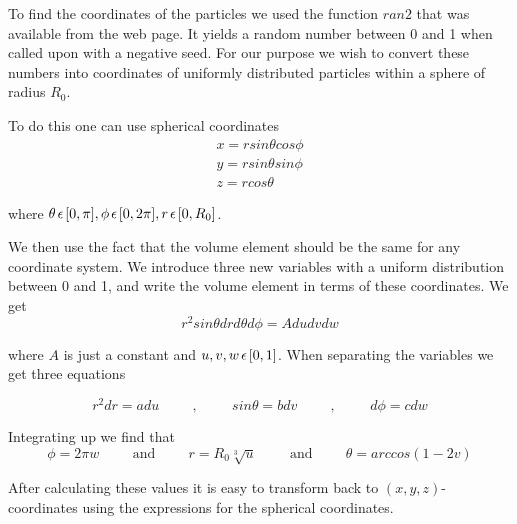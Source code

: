 \documentclass[a4paper,12pt, english]{article}
\begin{document}
To find the coordinates of the particles we used the function $ran2$ that was available from the web page. It yields a random number between 0 and 1 when called upon with a negative seed. For our purpose we wish to convert these numbers into coordinates of uniformly distributed particles within a sphere of radius $R_0$. 

To do this one can use spherical coordinates
\begin{align}
x = r sin \theta cos \phi \\
y = r sin \theta sin \phi \\
z = r cos \theta
\end{align}

where $ \theta \hspace{0.5mm} \epsilon \hspace{0.5mm} [0, \pi], \phi \hspace{0.5mm} \epsilon \hspace{0.5mm} [0, 2\pi], r \hspace{0.5mm} \epsilon \hspace{0.5mm} [0, R_0]$. 
 
We then use the fact that the volume element should be the same for any coordinate system. We introduce three new variables with a uniform distribution between 0 and 1, and write the volume element in terms of these coordinates. We get
\[
r^2 sin \theta dr d \theta d \phi = Adudvdw
\]

where $A$ is just a constant and $u, v, w \hspace{0.5mm} \epsilon \hspace{0.5mm} [0,1]$. When separating the variables we get three equations   

\[
r^2dr = adu \hspace{1cm}\mathrm{,}\hspace{1cm}
sin \theta = bdv \hspace{1cm}\mathrm{,}\hspace{1cm}
d \phi = cdw
\]

Integrating up we find that
\[
\phi = 2 \pi w  \hspace{1cm}\mathrm{and}\hspace{1cm}
r = R_0 \sqrt[3]{u}  \hspace{1cm}\mathrm{and}\hspace{1cm}
   \theta = arccos(1-2v) 
\]

After calculating these values it is easy to transform back to $(x,y,z)$-coordinates using the expressions for the spherical coordinates.
\end{document}
